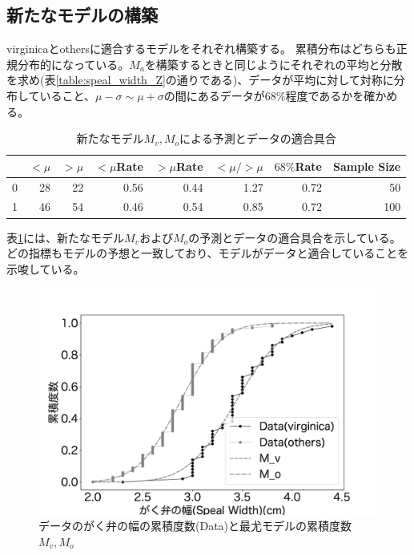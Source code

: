 \subsection{新たなモデルの構築}
virginicaとothersに適合するモデルをそれぞれ構築する。
累積分布はどちらも正規分布的になっている。$M_a$を構築するときと同じようにそれぞれの平均と分散を求め(表\ref{table:speal_width_Z}の通りである)、データが平均に対して対称に分布していること、$\mu-\sigma\sim\mu+\sigma$の間にあるデータが$68\%$程度であるかを確かめる。

\begin{table}
    \caption{新たなモデル$M_v,M_o$による予測とデータの適合具合}
    \label{table:speal_width_replace_model}
    \begin{tabular}{lrrrrrrr}
        \hline
        {} &  $<\mu$ &  $>\mu$ &  $<\mu$Rate &  $>\mu$Rate &  $<\mu/>\mu$  &  $68\%$Rate &  Sample Size \\
        \hline \hline
        0 &   28 &   22 &     0.56 &     0.44 &      1.27 &     0.72 &           50 \\
        1 &   46 &   54 &     0.46 &     0.54 &      0.85 &     0.72 &          100 \\
        \hline
    \end{tabular}
\end{table}   

表\ref{table:speal_width_replace_model}には、新たなモデル$M_v$および$M_o$の予測とデータの適合具合を示している。
どの指標もモデルの予想と一致しており、モデルがデータと適合していることを示唆している。

\begin{figure}
    \begin{center}
        \includegraphics[width=15cm]{./image/15_/speal_width_viri_model.pdf}
        \caption{データのがく弁の幅の累積度数(Data)と最尤モデルの累積度数$M_v,M_o$}
        \label{fig:speal_width_viri_model}
    \end{center}
\end{figure}

